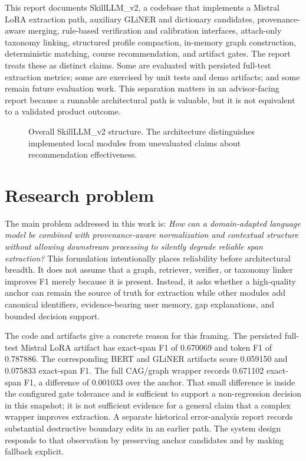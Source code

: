 This report documents SkillLLM\_v2, a codebase that implements a Mistral LoRA extraction path, auxiliary GLiNER and dictionary candidates, provenance-aware merging, rule-based verification and calibration interfaces, attach-only taxonomy linking, structured profile compaction, in-memory graph construction, deterministic matching, course recommendation, and artifact gates. The report treats these as distinct claims. Some are evaluated with persisted full-test extraction metrics; some are exercised by unit tests and demo artifacts; and some remain future evaluation work. This separation matters in an advisor-facing report because a runnable architectural path is valuable, but it is not equivalent to a validated product outcome.

\begin{figure}[H]
\centering

\caption{Overall SkillLLM\_v2 structure. The architecture distinguishes implemented local modules from unevaluated claims about recommendation effectiveness.}
\label{fig:overall}
\end{figure}

\section{Research problem}

The main problem addressed in this work is: \emph{How can a domain-adapted language model be combined with provenance-aware normalization and contextual structure without allowing downstream processing to silently degrade reliable span extraction?} This formulation intentionally places reliability before architectural breadth. It does not assume that a graph, retriever, verifier, or taxonomy linker improves F1 merely because it is present. Instead, it asks whether a high-quality anchor can remain the source of truth for extraction while other modules add canonical identifiers, evidence-bearing user memory, gap explanations, and bounded decision support.

The code and artifacts give a concrete reason for this framing. The persisted full-test Mistral LoRA artifact has exact-span F1 of 0.670069 and token F1 of 0.787886. The corresponding BERT and GLiNER artifacts score 0.059150 and 0.075833 exact-span F1. The full CAG/graph wrapper records 0.671102 exact-span F1, a difference of 0.001033 over the anchor. That small difference is inside the configured gate tolerance and is sufficient to support a non-regression decision in this snapshot; it is not sufficient evidence for a general claim that a complex wrapper improves extraction. A separate historical error-analysis report records substantial destructive boundary edits in an earlier path. The system design responds to that observation by preserving anchor candidates and by making fallback explicit.

